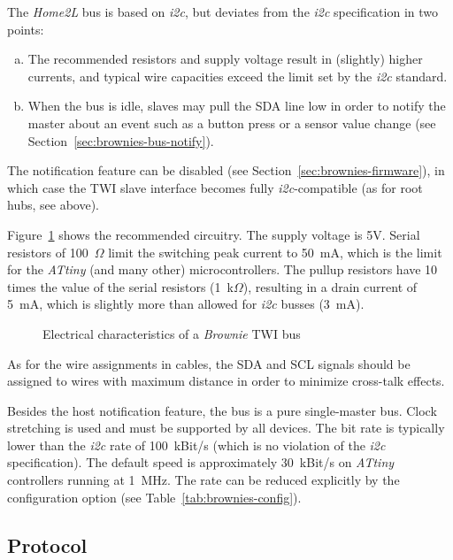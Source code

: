 \documentclass[12pt,english,parskip=half,headheight=19pt]{scrreprt}
\newcommand{\figsvg}[2][]{}            %
\newcommand{\figsvg}[2][]{\href{#2}{}} %
\newcommand{\lst}[1]{\colorbox{lstbackground}{\footnotesize\code{#1}}}
\begin{document}
The \textit{Home2L} bus is based on \textit{i2c}, but deviates from the \textit{i2c} specification in two points:
\begin{enumerate}[a)]
  \item The recommended resistors and supply voltage result in (slightly) higher currents, and typical wire capacities exceed the limit set by the \textit{i2c} standard.
  \item When the bus is idle, slaves may pull the SDA line low in order to notify the master about an event such as a button press or a sensor value change (see Section~\ref{sec:brownies-bus-notify}).
\end{enumerate}

The notification feature can be disabled (see Section~\ref{sec:brownies-firmware}), in which case the TWI slave interface becomes fully \textit{i2c}-compatible (as for root hubs, see above).

Figure~\ref{fig:brownies-electrical} shows the recommended circuitry. The supply voltage is 5V. Serial resistors of 100~$\Omega$ limit the switching peak current to 50~mA, which is the limit for the \textit{ATtiny} (and many other) microcontrollers. The pullup resistors have 10 times the value of the serial resistors (1~k$\Omega$), resulting in a drain current of 5~mA, which is slightly more than allowed for \textit{i2c} busses (3~mA).

\begin{figure}[ht]
  \centering
  \figsvg{figs/brownies-electrical.svg}
  \caption[l]{Electrical characteristics of a \textit{Brownie} TWI bus}
  \label{fig:brownies-electrical}
\end{figure}

As for the wire assignments in cables, the SDA and SCL signals should be assigned to wires with maximum distance in order to minimize cross-talk effects.

Besides the host notification feature, the bus is a pure single-master bus. Clock stretching is used and must be supported by all devices. The bit rate is typically lower than the \textit{i2c} rate of 100~kBit/s (which is no violation of the \textit{i2c} specification). The default speed is approximately 30~kBit/s on \textit{ATtiny} controllers running at 1~MHz. The rate can be reduced explicitly by the \lst{hub_speed} configuration option (see Table~\ref{tab:brownies-config}).



\subsection{Protocol}
\label{sec:brownies-bus-protocol}
\end{document}
